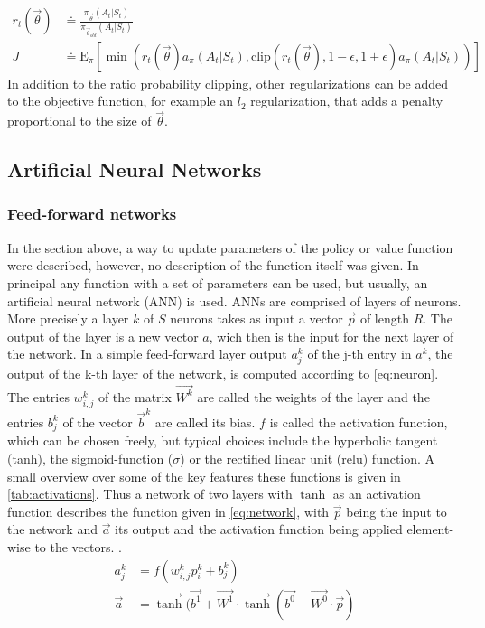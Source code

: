 \begin{align}
	r_t(\vec{\theta}) &\doteq \frac{\pi_{\vec{\theta}}(A_t \vert S_t)}{\pi_{\vec{\theta}_{old}} (A_t \vert S_t)} \\
	J &\doteq \mathrm{E}_\pi \left[\min \left(r_t(\vec{\theta}) a_\pi(A_t \vert S_t), \mathrm{clip}(r_t(\vec{\theta}), 1- \epsilon, 1+\epsilon) a_\pi(A_t \vert S_t) \right) \right] \label{eq:object_ppo}
\end{align}
In addition to the ratio probability clipping, other regularizations can be added to the objective function, for example an $l_2$ regularization, that adds a penalty proportional to the size of $\vec{\theta}$.



\subsection{Artificial Neural Networks}
\subsubsection{Feed-forward networks}
In the section above, a way to update parameters of the policy or value function were described, however, no description of the function itself was given. In principal any function with a set of parameters can be used, but usually, an artificial neural network (ANN) is used. ANNs are comprised of layers of neurons. More precisely a layer $k$ of $S$ neurons takes as input a vector $\vec{p}$ of length $R$. The output of the layer is a new vector $a$, wich then is the input for the next layer of the network. In a simple feed-forward layer output $a_j^k$ of the j-th entry in $a^k$, the output of the k-th layer of the network, is computed according to \eqref{eq:neuron}. The entries $w_{i,j}^k$ of the matrix $\vec{W^k}$ are called the weights of the layer and the entries $b_j^k$ of the vector $\vec{b}^k$ are called its bias. $f$ is called the activation function, which can be chosen freely, but typical choices include the hyperbolic tangent (tanh), the sigmoid-function ($\sigma$) or the rectified linear unit ($\mathrm{relu}$) function. A small overview over some of the key features these functions is given in \autoref{tab:activations}. Thus a network of two layers with $\tanh$ as an activation function describes the function given in \eqref{eq:network}, with $\vec{p}$  being the input to the network and $\vec{a}$ its output and the activation function being applied element-wise to the vectors. \cite[p. 2-2 - 2-12]{demuth_neural_2014}.
\begin{align}
	a_j^k &= f(w_{i,j}^k p^k_i + b_j^k) \label{eq:neuron} \\
	\vec{a} &= \vec{\tanh} (\vec{b^1} + \vec{W^1} \cdot \vec{\tanh}( \vec{b^0} + \vec{W^0} \cdot \vec{p} ) \label{eq:network}
\end{align}

